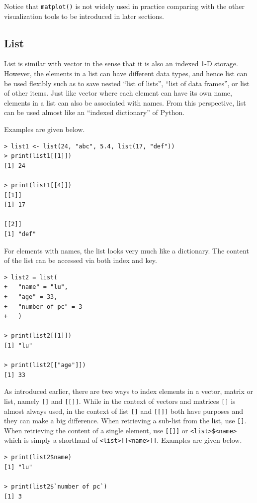 Notice that \verb|matplot()| is not widely used in practice comparing with the other visualization tools to be introduced in later sections.

\subsection{List}

List is similar with vector in the sense that it is also an indexed 1-D storage. However, the elements in a list can have different data types, and hence list can be used flexibly such as to save nested ``list of lists'', ``list of data frames'', or list of other items. Just like vector where each element can have its own name, elements in a list can also be associated with names. From this perspective, list can be used almost like an ``indexed dictionary'' of Python.

Examples are given below.
\begin{lstlisting}
> list1 <- list(24, "abc", 5.4, list(17, "def"))
> print(list1[[1]])
[1] 24

> print(list1[[4]])
[[1]]
[1] 17

[[2]]
[1] "def"
\end{lstlisting} 

For elements with names, the list looks very much like a dictionary. The content of the list can be accessed via both index and key.
\begin{lstlisting}
> list2 = list(
+   "name" = "lu",
+   "age" = 33,
+   "number of pc" = 3
+   )

> print(list2[[1]])
[1] "lu"

> print(list2[["age"]])
[1] 33
\end{lstlisting}

As introduced earlier, there are two ways to index elements in a vector, matrix or list, namely \verb|[]| and \verb|[[]]|. While in the context of vectors and matrices \verb|[]| is almost always used, in the context of list \verb|[]| and \verb|[[]]| both have purposes and they can make a big difference. When retrieving a sub-list from the list, use \verb|[]|. When retrieving the content of a single element, use \verb|[[]]| or  \verb|<list>$<name>| which is simply a shorthand of \verb|<list>[[<name>]]|. Examples are given below.
\begin{lstlisting}
> print(list2$name)
[1] "lu"

> print(list2$`number of pc`)
[1] 3
\end{lstlisting}

